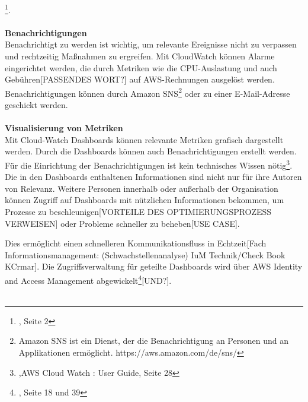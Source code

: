 \footnote{\cite{AMZ13}, Seite 2}.
\\\\
\textbf{Benachrichtigungen}\\
Benachrichtigt zu werden ist wichtig, um relevante Ereignisse nicht zu verpassen und rechtzeitig Maßnahmen zu ergreifen. Mit CloudWatch können Alarme eingerichtet werden, die durch Metriken wie die CPU-Auslastung und auch Gebühren[PASSENDES WORT?] auf AWS-Rechnungen ausgelöst werden.
Benachrichtigungen können durch Amazon SNS\footnote{Amazon SNS ist ein Dienst, der die Benachrichtigung an Personen und an Applikationen ermöglicht. https://aws.amazon.com/de/sns/} oder zu einer E-Mail-Adresse geschickt werden.
\\\\
\textbf{Visualisierung von Metriken}\\
Mit Cloud-Watch Dashboards können relevante Metriken grafisch dargestellt werden. %
Durch die Dashboards können auch Benachrichtigungen erstellt werden. Für die Einrichtung der Benachrichtigungen ist kein technisches Wissen nötig\footnote{\cite{AMZ14},AWS Cloud Watch : User Guide, Seite 28}.
Die in den Dashboards enthaltenen Informationen sind nicht nur für ihre Autoren von Relevanz.
Weitere Personen innerhalb oder außerhalb der Organisation können Zugriff auf Dashboards mit nützlichen Informationen bekommen, um Prozesse zu beschleunigen[VORTEILE DES OPTIMIERUNGSPROZESS VERWEISEN] oder Probleme schneller zu beheben[USE CASE].

Dies ermöglicht einen schnelleren Kommunikationsfluss in Echtzeit[Fach Informationsmanagement: (Schwachstellenanalyse) IuM Technik/Check Book KCrmar]. Die Zugriffsverwaltung für geteilte Dashboards wird über AWS Identity and Access Management abgewickelt\footnote{\cite{AMZ14}, Seite 18 und 39}[UND?].
\\\\
